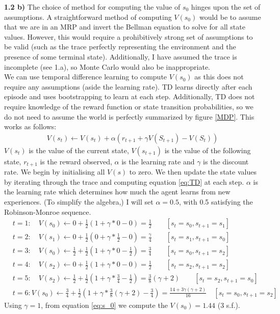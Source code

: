 \documentclass[12pt,twoside]{article}
\begin{document}
\textbf{1.2 b)} The choice of method for computing the value of $s_0$ hinges upon the set of assumptions. A straightforward method of computing $V(s_0)$ would be to assume that we are in an MRP and invert the Bellman equation to solve for all state values. However, this would require a prohibitively strong set of assumptions to be valid (such as the trace perfectly representing the environment and the presence of some terminal state). Additionally, I have assumed the trace is incomplete (see 1.a), so Monte Carlo would also be inappropriate.\\ 

We can use temporal difference learning to compute $V(s_0)$ as this does not require any assumptions (aside the learning rate). TD learns directly after each episode and uses bootstrapping to learn at each step. Additionally, TD does not require knowledge of the reward function or state transition probabilities, so we do not need to assume the world is perfectly summarized by figure \ref{MDP}. This works as follows:
\begin{align}
    V(s_t) \leftarrow V(s_t) + \alpha(r_{t+1} + \gamma V(S_{t+1}) - V(S_t))
    \label{eq:TD}
\end{align}
$V(s_t)$ is the value of the current state, $V(s_{t+1})$ is the value of the following state, $r_{t+1}$ is the reward observed, $\alpha$ is the learning rate and $\gamma$ is the discount rate. We begin by initialising all $V(s)$ to zero. We then update the state values by iterating through the trace and computing equation \ref{eq:TD} at each step. $\alpha$ is the learning rate which determines how much the agent learns from new experiences. (To simplify the algebra,) I will set $\alpha = 0.5$, with 0.5 satisfying the Robinson-Monroe sequence.
\begin{align}
    & t = 1: \quad V(s_0) \leftarrow 0 + \frac{1}{2}(1+\gamma *0-0) = \frac{1}{2} \quad \quad [s_t = s_0, s_{t+1}=s_1]\\
    & t = 2: \quad V(s_1) \leftarrow 0 + \frac{1}{2}(0+ \gamma*\frac{1}{2}  - 0) = \frac{\gamma}{4} \quad \quad [s_t = s_1, s_{t+1}=s_0]\\
    & t = 3: \quad V(s_0) \leftarrow \frac{1}{2} + \frac{1}{2}(1+\gamma*0 - \frac{1}{2}) = \frac{3}{4} \quad \quad [s_t = s_0, s_{t+1}=s_2]\\
    & t = 4: \quad V(s_2) \leftarrow 0 + \frac{1}{2}(1+\gamma*0 -0) = \frac{1}{2} \quad \quad [s_t = s_2, s_{t+1}=s_2]\\
    & t = 5: \quad V(s_2) \leftarrow \frac{1}{2} + \frac{1}{2} (1+\gamma*\frac{3}{4} - \frac{1}{2}) = \frac{3}{8}(\gamma +2) \quad \quad [s_t = s_2, s_{t+1}=s_0]\\
    & t = 6: V(s_0) \leftarrow \frac{3}{4} + \frac{1}{2} (1+\gamma*\frac{3}{8}(\gamma +2)-\frac{3}{4}) = \frac{14 + 3\gamma (\gamma + 2)}{16}  \quad [s_t = s_0, s_{t+1}=s_2] \label{eq:s_0}
\end{align}
Using $\gamma=1$, from equation \ref{eq:s_0} we compute the $V(s_0)=1.44$ (3 s.f.).\\
\end{document}
